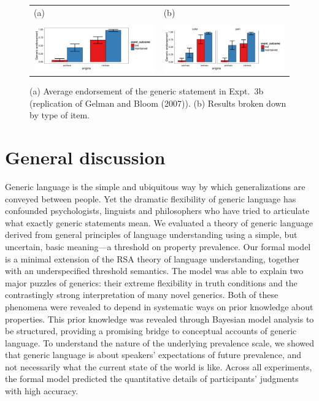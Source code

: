 \documentclass[12pt,letterpaper]{article}
\begin{document}
\begin{figure}
\begin{tabular}{l l}
(a) & (b) \\
\\
\centering
    \includegraphics[width=0.5\columnwidth]{dobles-results.pdf} &
    \includegraphics[width=0.5\columnwidth]{dobles-byItem-results.pdf} \\
\end{tabular}
    \caption{
    (a) Average endorsement of the generic statement in Expt.~3b (replication of Gelman and Bloom (2007)). (b)  Results broken down by type of item.
  }
  \label{fig:dobles-results}
\end{figure}




\section*{General discussion}

Generic language is the simple and ubiquitous way by which generalizations are conveyed between people.
Yet the dramatic flexibility of generic language has confounded psychologists, linguists and philosophers who have tried to articulate what exactly generic statements mean. 
We evaluated a theory of generic language derived from general principles of language understanding using a simple, but uncertain, basic meaning---a threshold on property prevalence.
Our formal model is a minimal extension of the RSA theory of language understanding, together with an underspecified threshold semantics.
The model was able to explain two major puzzles of generics: their extreme flexibility in truth conditions and the contrastingly strong interpretation of many novel generics.
Both of these phenomena were revealed to depend in systematic ways on prior knowledge about properties.
This prior knowledge was revealed through Bayesian model analysis to be structured, providing a promising bridge to conceptual accounts of generic language.
To understand the nature of the underlying prevalence scale, we showed that generic language is about speakers' expectations of future prevalence, and not necessarily what the current state of the world is like. 
Across all experiments, the formal model predicted the quantitative details of participants' judgments with high accuracy.
\end{document}
